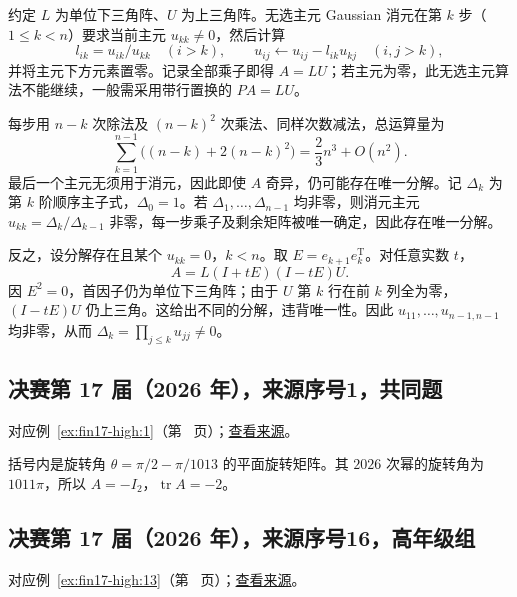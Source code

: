 \documentclass[12pt,fontset=fandol]{ctexart}
\begin{document}
\begin{solve}

约定 $L$ 为单位下三角阵、$U$ 为上三角阵。无选主元 Gaussian 消元在第 $k$ 步（$1\le k<n$）要求当前主元 $u_{kk}\ne0$，然后计算
\[
l_{ik}=u_{ik}/u_{kk}\quad(i>k),\qquad
u_{ij}\leftarrow u_{ij}-l_{ik}u_{kj}\quad(i,j>k),
\]
并将主元下方元素置零。记录全部乘子即得 $A=LU$；若主元为零，此无选主元算法不能继续，一般需采用带行置换的 $PA=LU$。

每步用 $n-k$ 次除法及 $(n-k)^2$ 次乘法、同样次数减法，总运算量为
\[
\sum_{k=1}^{n-1}\bigl((n-k)+2(n-k)^2\bigr)
=\frac23n^3+O(n^2).
\]
最后一个主元无须用于消元，因此即使 $A$ 奇异，仍可能存在唯一分解。记 $\Delta_k$ 为第 $k$ 阶顺序主子式，$\Delta_0=1$。若 $\Delta_1,\dots,\Delta_{n-1}$ 均非零，则消元主元 $u_{kk}=\Delta_k/\Delta_{k-1}$ 非零，每一步乘子及剩余矩阵被唯一确定，因此存在唯一分解。

反之，设分解存在且某个 $u_{kk}=0$，$k<n$。取 $E=e_{k+1}e_k^{\mathrm T}$。对任意实数 $t$，
\[
A=L(I+tE)(I-tE)U.
\]
因 $E^2=0$，首因子仍为单位下三角阵；由于 $U$ 第 $k$ 行在前 $k$ 列全为零，$(I-tE)U$ 仍上三角。这给出不同的分解，违背唯一性。因此 $u_{11},\dots,u_{n-1,n-1}$ 均非零，从而 $\Delta_k=\prod_{j\le k}u_{jj}\ne0$。

\end{solve}

\subsection{决赛第 17 届（2026 年），来源序号1，共同题}\label{ans:fin17-high:1}\label{pr:fin17-high:1}

对应例~\ref{ex:fin17-high:1}（第~\pageref{ex:fin17-high:1} 页）；\href{https://github.com/lzxcr/cmc-mathematics/blob/64916fa1fdbc3e444a652eca204d5669058ee321/src/problems/finals/17/01.md}{查看来源}。

\begin{solve}

括号内是旋转角 $\theta=\pi/2-\pi/1013$ 的平面旋转矩阵。其 $2026$ 次幂的旋转角为 $1011\pi$，所以 $A=-I_2$，$\boxed{\operatorname{tr}A=-2}$。

\end{solve}

\subsection{决赛第 17 届（2026 年），来源序号16，高年级组}\label{ans:fin17-high:13}\label{pr:fin17-high:13}

对应例~\ref{ex:fin17-high:13}（第~\pageref{ex:fin17-high:13} 页）；\href{https://github.com/lzxcr/cmc-mathematics/blob/64916fa1fdbc3e444a652eca204d5669058ee321/src/problems/finals/17/16.md}{查看来源}。
\end{document}
